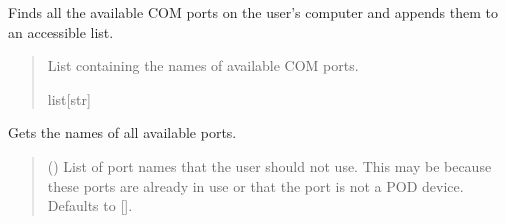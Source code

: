 \documentclass[letterpaper,10pt,english]{sphinxmanual}
\begin{document}
\begin{fulllineitems}

\begin{fulllineitems}
\label{\detokenize{PodApi.Devices.SerialPorts:PodApi.Devices.SerialPorts.PortAccess.FindPorts.GetAllPortNames}}
\pysigstartsignatures
{}
\pysigstopsignatures
\sphinxAtStartPar
Finds all the available COM ports on the user’s computer and appends them to an         accessible list.
\begin{quote}\begin{description}
\sphinxAtStartPar
List containing the names of available COM ports.

\sphinxAtStartPar
list{[}str{]}

\end{description}\end{quote}

\end{fulllineitems}


\begin{fulllineitems}
\label{\detokenize{PodApi.Devices.SerialPorts:PodApi.Devices.SerialPorts.PortAccess.FindPorts.GetSelectPortNames}}
\pysigstartsignatures
{}
\pysigstopsignatures
\sphinxAtStartPar
Gets the names of all available ports.
\begin{quote}\begin{description}
\sphinxAtStartPar
{} (\sphinxstyleliteralemphasis{\sphinxupquote{{[}}}\sphinxstyleliteralemphasis{\sphinxupquote{{]}}}\sphinxstyleliteralemphasis{\sphinxupquote{, }}) \textendash{} List of port names that the user should                 not use. This may be because these ports are already in use or that                 the port is not a POD device. Defaults to {[}{]}.


\end{description}
\end{quote}
\end{fulllineitems}
\end{fulllineitems}
\end{document}
